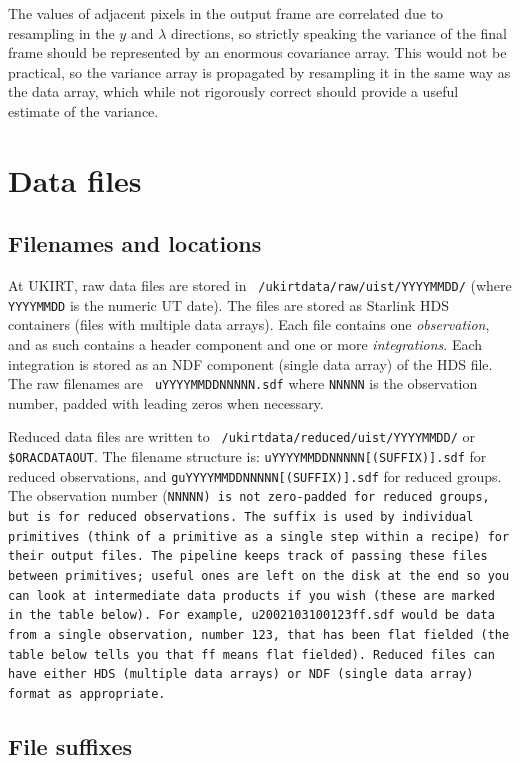 \documentclass[twoside,11pt]{article}
\renewcommand{\_}{\texttt{\symbol{95}}}
\begin{document}
The values of adjacent pixels in the output frame are correlated due
to resampling in the $y$ and $\lambda$ directions, so strictly
speaking the variance of the final frame should be represented by an
enormous covariance array. This would not be practical, so the
variance array is propagated by resampling it in the same way as the
data array, which while not rigorously correct should provide a
useful estimate of the variance.


\section{Data files}

\subsection{Filenames and locations}

At UKIRT, raw data files are stored in {\tt
  /ukirtdata/raw/uist/YYYYMMDD/} (where {\tt YYYYMMDD} is the numeric
UT date).  The files are stored as Starlink HDS containers (files
with multiple data arrays). Each file contains one \emph{observation},
and as such contains a header component and one or more
\emph{integrations}.  Each integration is stored as an NDF component
(single data array) of the HDS file. The raw filenames are {\tt
  uYYYYMMDD\_NNNNN.sdf} where {\tt NNNNN} is the observation number,
padded with leading zeros when necessary.

Reduced data files are written to {\tt
  /ukirtdata/reduced/uist/YYYYMMDD/} or {\tt \$ORAC\_DATA\_OUT}.  The
filename structure is: {\tt uYYYYMMDD\_NNNNN[\_(SUFFIX)].sdf} for reduced
observations, and {\tt guYYYYMMDD\_NNNNN[\_(SUFFIX)].sdf} for reduced
groups. The observation number (\tt{NNNNN}) is not zero-padded for
reduced groups, but is for reduced observations.
The suffix is used by individual primitives (think of a primitive as
a single step within a recipe) for their output files. The pipeline
keeps track of passing these files between primitives; useful ones are
left on the disk at the end so you can look at intermediate data
products if you wish (these are marked in the table below).
For example, {\tt u20021031\_00123\_ff.sdf} would be data from a single
observation, number 123, that has been flat fielded (the table below
tells you that {\tt \_ff} means flat fielded). Reduced files can have either
HDS (multiple data arrays) or NDF (single data array) format as
appropriate.

\subsection{File suffixes}
\end{document}
